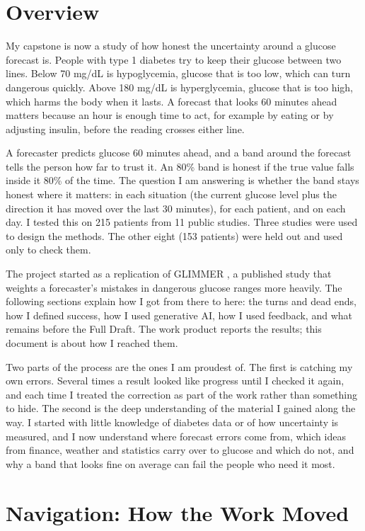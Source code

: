 \section{Overview}

My capstone is now a study of how honest the uncertainty around a glucose forecast is. People with type 1 diabetes try to keep their glucose between two lines. Below 70 mg/dL is hypoglycemia, glucose that is too low, which can turn dangerous quickly. Above 180 mg/dL is hyperglycemia, glucose that is too high, which harms the body when it lasts. A forecast that looks 60 minutes ahead matters because an hour is enough time to act, for example by eating or by adjusting insulin, before the reading crosses either line.

A forecaster predicts glucose 60 minutes ahead, and a band around the forecast tells the person how far to trust it. An 80\% band is honest if the true value falls inside it 80\% of the time. The question I am answering is whether the band stays honest where it matters: in each situation (the current glucose level plus the direction it has moved over the last 30 minutes), for each patient, and on each day. I tested this on 215 patients from 11 public studies. Three studies were used to design the methods. The other eight (153 patients) were held out and used only to check them.

The project started as a replication of GLIMMER \parencite{glimmer2026}, a published study that weights a forecaster's mistakes in dangerous glucose ranges more heavily. The following sections explain how I got from there to here: the turns and dead ends, how I defined success, how I used generative AI, how I used feedback, and what remains before the Full Draft. The work product reports the results; this document is about how I reached them.

Two parts of the process are the ones I am proudest of. The first is catching my own errors. Several times a result looked like progress until I checked it again, and each time I treated the correction as part of the work rather than something to hide. The second is the deep understanding of the material I gained along the way. I started with little knowledge of diabetes data or of how uncertainty is measured, and I now understand where forecast errors come from, which ideas from finance, weather and statistics carry over to glucose and which do not, and why a band that looks fine on average can fail the people who need it most.

\section{Navigation: How the Work Moved}

